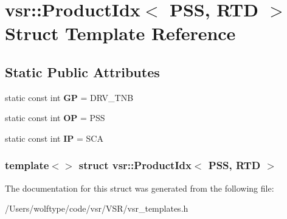 \hypertarget{structvsr_1_1_product_idx_3_01_p_s_s_00_01_r_t_d_01_4}{\section{vsr\-:\-:Product\-Idx$<$ P\-S\-S, R\-T\-D $>$ Struct Template Reference}
\label{structvsr_1_1_product_idx_3_01_p_s_s_00_01_r_t_d_01_4}
}
\subsection*{Static Public Attributes}
\begin{DoxyCompactItemize}
\item 
\hypertarget{structvsr_1_1_product_idx_3_01_p_s_s_00_01_r_t_d_01_4_a879088031f2164aa2045affd3bc574ac}{static const int {\bfseries G\-P} = D\-R\-V\-\_\-\-T\-N\-B}\label{structvsr_1_1_product_idx_3_01_p_s_s_00_01_r_t_d_01_4_a879088031f2164aa2045affd3bc574ac}

\item 
\hypertarget{structvsr_1_1_product_idx_3_01_p_s_s_00_01_r_t_d_01_4_a30076e34afadd62becb26264e8a18d07}{static const int {\bfseries O\-P} = P\-S\-S}\label{structvsr_1_1_product_idx_3_01_p_s_s_00_01_r_t_d_01_4_a30076e34afadd62becb26264e8a18d07}

\item 
\hypertarget{structvsr_1_1_product_idx_3_01_p_s_s_00_01_r_t_d_01_4_ac51b04860de4321166670e9ae449b752}{static const int {\bfseries I\-P} = S\-C\-A}\label{structvsr_1_1_product_idx_3_01_p_s_s_00_01_r_t_d_01_4_ac51b04860de4321166670e9ae449b752}

\end{DoxyCompactItemize}
\subsubsection*{template$<$$>$ struct vsr\-::\-Product\-Idx$<$ P\-S\-S, R\-T\-D $>$}



The documentation for this struct was generated from the following file\-:\begin{DoxyCompactItemize}
\item 
/\-Users/wolftype/code/vsr/\-V\-S\-R/vsr\-\_\-templates.\-h\end{DoxyCompactItemize}
